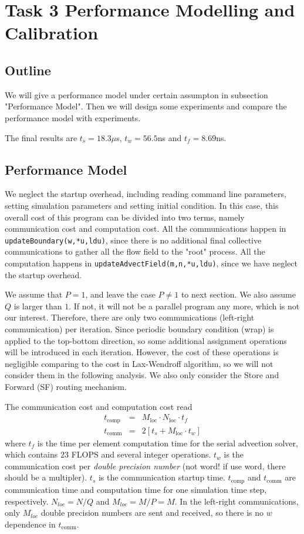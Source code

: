 \section{Task 3 Performance Modelling and Calibration} 

\subsection{Outline}
We will give a performance model under certain assumpton in subsection "Performance Model".
Then we will design some experiments and compare the performance model with experiments.

The final results are $t_s = 18.3\mu$s, $t_w = 56.5$ns and $t_f = 8.69$ns.

\subsection{Performance Model}
We neglect the startup overhead, including reading command line parameters, setting simulation parameters and setting initial condition.
In this case, this overall cost of this program can be divided into two terms, namely communication cost and computation cost.
All the communications happen in \lstinline{updateBoundary(w,*u,ldu)}, since there is no additional final collective communications to gather all
the flow field to the "root" process. All the computation happens in \lstinline{updateAdvectField(m,n,*u,ldu)}, since we have neglect the startup
overhead.

We assume that $P=1$, and leave the case $P \neq 1$ to next section. We also assume $Q$ is larger than $1$. If not,
it will not be a parallel program any more, which is not our interest. Therefore, there are only two communications
(left-right communication) per iteration. Since periodic boundary condition (wrap) is applied to the top-bottom direction,
so some additional assignment operations will be introduced in each iteration. However, the cost of these operations is 
negligible comparing to the cost in Lax-Wendroff algorithm, so we will not consider them in the following analysis.
We also only consider the Store and Forward (SF) routing mechanism.

The communication cost and computation cost read
\begin{eqnarray*}
	t_{\textrm{comp}} &=& M_{\textrm{loc}} \cdot N_{\textrm{loc}} \cdot t_f \\
	t_{\textrm{comm}} &=& 2 \left[ t_s + M_{\textrm{loc}} \cdot t_w  \right] 
\end{eqnarray*}
where $t_f$ is the time per element computation time for the serial advection solver, which contains $23$ FLOPS and several integer operations.
$t_w$ is the communication cost per \textit{double precision number} (not word! if use word, there should be a multipler).
$t_s$ is the communication startup time.
$t_{\textrm{comp}}$ and $t_{\textrm{comm}}$ are communication time and computation time for one simulation time step, respectively.
$N_{loc} = N/Q$ and $M_{loc}= M/P = M$. In the left-right communications, only $M_{loc}$ double precision numbers are sent and received,
so there is no $w$ dependence in $t_{\textrm{comm}}$.

